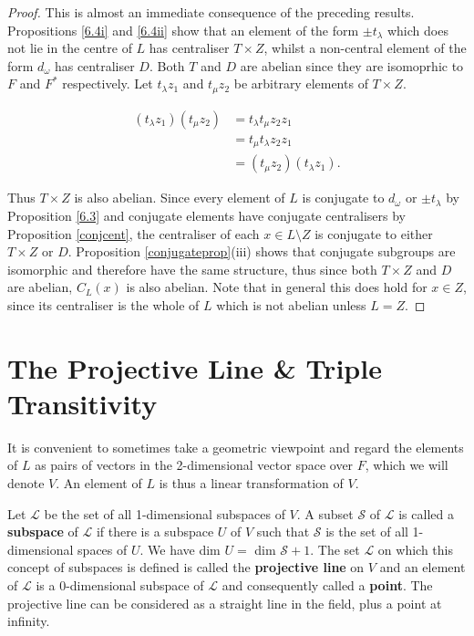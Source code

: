 \begin{proof} This is almost an immediate consequence of the preceding results. Propositions \ref{6.4i} and \ref{6.4ii} show that an element of the form $\pm t_\lambda$ which does not lie in the centre of $L$ has centraliser $T \times Z$, whilst a non-central element of the form $d_\omega$ has centraliser $D$. Both $T$ and $D$ are abelian since they are isomoprhic to $F$ and $F^*$ respectively. Let $t_\lambda z_1$ and $t_\mu z_2$  be arbitrary elements of $T \times Z$.

\vspace{-.5mm}
\begin{align*} (t_\lambda z_1)(t_\mu z_2)  &= t_\lambda t_\mu z_2 z_1  \tag{since  $z_1 \in Z$}
\\ &= t_\mu t_\lambda z_2 z_1  \tag{since  $T$ is abelian}
\\ &= (t_\mu z_2)(t_\lambda z_1).   \tag{since  $z_2 \in Z$}
\end {align*} 

Thus $T \times Z$ is also abelian. Since every element of $L$ is conjugate to $d_\omega$ or $\pm t_\lambda$ by Proposition \ref{6.3} and conjugate elements have conjugate centralisers by Proposition \ref{conjcent}, the centraliser of each $x \in L \setminus Z$ is conjugate to either $T \times Z$ or $D$. Proposition \ref{conjugateprop}(iii) shows that conjugate subgroups are isomorphic and therefore have the same structure, thus since both $T \times Z$ and $D$ are abelian, $C_L(x)$ is also abelian. Note that in general this does hold for $x \in Z$, since its centraliser is the whole of $L$ which is not abelian unless $L = Z$.

\end{proof}

\section{The Projective Line \& Triple Transitivity}

It is convenient to sometimes take a geometric viewpoint and regard the elements of $L$ as pairs of vectors in the 2-dimensional vector space over $F$, which we will denote $V$. An element of $L$ is thus a linear transformation of $V$. 

\begin{definition} Let $\mathscr{L}$ be the set of all 1-dimensional subspaces of $V$. A subset $\mathscr{S}$ of $\mathscr{L}$ is called a \textbf{subspace} of $\mathscr{L}$ if there is a subspace $U$ of $V$ such that $\mathscr{S}$ is the set of all 1-dimensional spaces of $U$. We have dim $U =$ dim $\mathscr{S} + 1$. The set $\mathscr{L}$ on which this concept of subspaces is defined is called the \textbf{projective line} on $V$ and an element of $\mathscr{L}$ is a 0-dimensional subspace of $\mathscr{L}$ and consequently called a \textbf{point}. The projective line can be considered as a straight line in the field, plus a point at infinity.
\end{definition}

